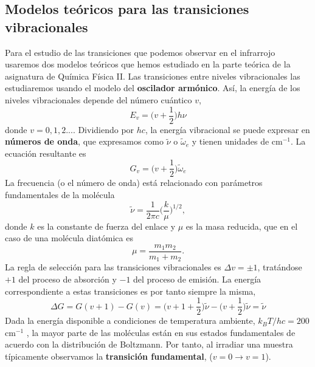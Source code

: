 \documentclass{tufte-book}
\begin{document}
\subsection{Modelos teóricos para las transiciones vibracionales}
Para el estudio de las transiciones que podemos observar en el infrarrojo
usaremos dos modelos teóricos que hemos estudiado en la parte teórica de la
asignatura de Química Física II. Las transiciones entre niveles 
vibracionales las estudiaremos usando el modelo del \textbf{oscilador
armónico}. Así, la energía de los niveles vibracionales depende del 
número cuántico $v$,
\begin{equation}
    E_v=\bigg(v+\frac{1}{2}\bigg)h\nu
\end{equation}
donde $v=0,1,2...$. 
Dividiendo por $hc$, la energía vibracional se puede expresar en 
\textbf{números de onda}, que expresamos como $\tilde{\nu}$ o
$\tilde{\omega}_e$ y tienen unidades de cm$^{-1}$. La ecuación 
resultante es
\begin{equation}
    G_v=\bigg(v+\frac{1}{2}\bigg)\tilde{\omega}_e
\end{equation}
La frecuencia (o el número de onda) está relacionado con parámetros
fundamentales de la molécula
\begin{equation}
    \tilde{\nu}=\frac{1}{2\pi c}\Big(\frac{k}{\mu}\Big)^{1/2},
    \label{eq:nu}
\end{equation}
donde $k$ es la constante de fuerza del enlace y $\mu$ es la masa 
reducida, que en el caso de una molécula diatómica es 
\begin{equation}
    \mu=\frac{m_1m_2}{m_1+m_2}.
\end{equation}
La regla de selección para las transiciones vibracionales es 
$\Delta v=\pm 1$, tratándose $+1$ del proceso de absorción 
y $-1$ del proceso de emisión. La energía correspondiente a
estas transiciones es por tanto siempre la misma, 
\begin{equation}
    \Delta G=G(v+1)-G(v) = \bigg(v+1+\frac{1}{2}\bigg)\tilde{\nu} -
     \bigg(v+\frac{1}{2}\bigg)\tilde{\nu} = \tilde{\nu}
\end{equation}
Dada la energía disponible a condiciones de temperatura 
ambiente, $k_BT/hc=200$ cm$^{-1}$ , la mayor parte de las 
moléculas están en sus estados fundamentales de acuerdo con
la distribución de Boltzmann. Por tanto, al irradiar una 
muestra típicamente observamos la \textbf{transición fundamental}, 
($v=0\rightarrow v=1$).
\end{document}
